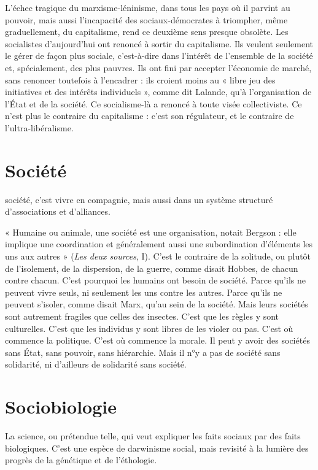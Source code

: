L’échec tragique du marxisme-léninisme, dans tous les pays où il parvint au
pouvoir, mais aussi l’incapacité des sociaux-démocrates à triompher, même graduellement,
du capitalisme, rend ce deuxième sens presque obsolète. Les socialistes
d’aujourd’hui ont renoncé à sortir du capitalisme. Ils veulent seulement le
gérer de façon plus sociale, c’est-à-dire dans l’intérêt de l’ensemble de la société
et, spécialement, des plus pauvres. Ils ont fini par accepter l’économie de
marché, sans renoncer toutefois à l’encadrer : ils croient moins au « libre jeu des
initiatives et des intérêts individuels », comme dit Lalande, qu’à l’organisation
de l’État et de la société. Ce socialisme-là a renoncé à toute visée collectiviste.
Ce n’est plus le contraire du capitalisme : c’est son régulateur, et le contraire de
l'ultra-libéralisme.

\section{Société}
société, c’est vivre en compagnie, mais aussi dans un système
structuré d'associations et d’alliances.

« Humaine ou animale, une société est une organisation, notait Bergson :
elle implique une coordination et généralement aussi une subordination d’éléments
les uns aux autres » ({\it Les deux sources}, I). C’est le contraire de la solitude,
ou plutôt de l'isolement, de la dispersion, de la guerre, comme disait
Hobbes, de chacun contre chacun. C’est pourquoi les humains ont besoin de
société. Parce qu’ils ne peuvent vivre seuls, ni seulement les uns contre les
autres. Parce qu’ils ne peuvent s’isoler, comme disait Marx, qu’au sein de la
société. Mais leurs sociétés sont autrement fragiles que celles des insectes. C’est
que les règles y sont culturelles. C’est que les individus y sont libres de les violer
ou pas. C'est où commence la politique. C’est où commence la morale. Il peut
y avoir des sociétés sans État, sans pouvoir, sans hiérarchie. Mais il n°y a pas de
société sans solidarité, ni d’ailleurs de solidarité sans société.

\section{Sociobiologie}
La science, ou prétendue telle, qui veut expliquer les
faits sociaux par des faits biologiques. C’est une espèce
de darwinisme social, mais revisité à la lumière des progrès de la génétique et
de l’éthologie.


